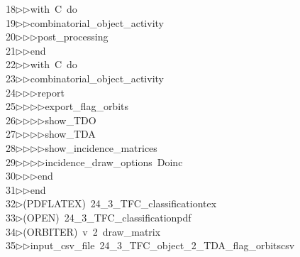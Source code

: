 \begin{tabbing}
18\>$\triangleright$\>$\triangleright$\>with\ C\ do\ \\[0pt]
19\>$\triangleright$\>$\triangleright$\>combinatorial\_object\_activity\ \\[0pt]
20\>$\triangleright$\>$\triangleright$\>$\triangleright$\>post\_processing\ \\[0pt]
21\>$\triangleright$\>$\triangleright$\>end\ \\[0pt]
22\>$\triangleright$\>$\triangleright$\>with\ C\ do\ \\[0pt]
23\>$\triangleright$\>$\triangleright$\>combinatorial\_object\_activity\ \\[0pt]
24\>$\triangleright$\>$\triangleright$\>$\triangleright$\>report\ \\[0pt]
25\>$\triangleright$\>$\triangleright$\>$\triangleright$\>$\triangleright$\>export\_flag\_orbits\ \\[0pt]
26\>$\triangleright$\>$\triangleright$\>$\triangleright$\>$\triangleright$\>show\_TDO\ \\[0pt]
27\>$\triangleright$\>$\triangleright$\>$\triangleright$\>$\triangleright$\>show\_TDA\ \\[0pt]
28\>$\triangleright$\>$\triangleright$\>$\triangleright$\>$\triangleright$\>show\_incidence\_matrices\ \\[0pt]
29\>$\triangleright$\>$\triangleright$\>$\triangleright$\>$\triangleright$\>incidence\_draw\_options\ Doinc\ \\[0pt]
30\>$\triangleright$\>$\triangleright$\>$\triangleright$\>end\ \\[0pt]
31\>$\triangleright$\>$\triangleright$\>end\\[0pt]
32\>$\triangleright$\>(PDFLATEX)\ 24\_3\_TFC\_classificationtex\\[0pt]
33\>$\triangleright$\>(OPEN)\ 24\_3\_TFC\_classificationpdf\\[0pt]
34\>$\triangleright$\>(ORBITER)\ v\ 2\ draw\_matrix\ \\[0pt]
35\>$\triangleright$\>$\triangleright$\>input\_csv\_file\ 24\_3\_TFC\_object\_2\_TDA\_flag\_orbitscsv\ \\[0pt]

\end{tabbing}
